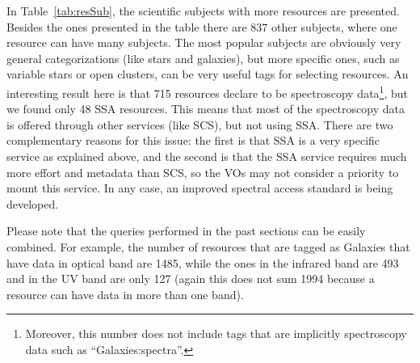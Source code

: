 In Table~\ref{tab:resSub}, the scientific subjects with more resources are presented. Besides the ones
presented in the table there are 837 other subjects, where one resource can have many subjects. 
The most popular subjects are obviously very general categorizations (like stars and galaxies), but
more specific ones, such as variable stars or open clusters, can be very useful tags for selecting
resources. An interesting result here is that 715 resources declare to be spectroscopy data\footnote{Moreover, this number does not include tags that are implicitly spectroscopy data such as ``Galaxies:spectra''.}, but we
found only 48 SSA resources. This means that most of the spectroscopy data is offered through other
services (like SCS), but not using SSA. There are two complementary reasons for this issue: the first
is that SSA is a very specific service as explained above, and the second is that the SSA service requires
much more effort and metadata than SCS, so the VOs may not consider a priority to mount this service.
In any case, an improved spectral access standard is being developed.

Please note that the queries performed in the past sections can be easily combined. For example,
the number of resources that are tagged as Galaxies that have data in optical band are 1485, while the ones in
the infrared band are 493 and in the UV band are only 127 (again this does not sum 1994 because a resource can have data
in more than one band). 



